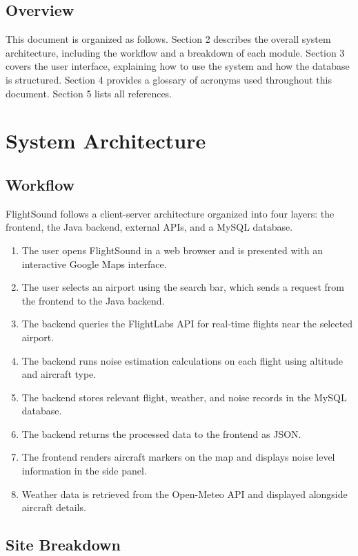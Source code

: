 \documentclass[12pt]{article}
\begin{document}
\subsection{Overview}
This document is organized as follows. Section 2 describes the overall system architecture, including the workflow and a breakdown of each module. Section 3 covers the user interface, explaining how to use the system and how the database is structured. Section 4 provides a glossary of acronyms used throughout this document. Section 5 lists all references.

\newpage

\section{System Architecture}

\subsection{Workflow}
FlightSound follows a client-server architecture organized into four layers: the frontend, the Java backend, external APIs, and a MySQL database.

\begin{enumerate}
\item The user opens FlightSound in a web browser and is presented with an interactive Google Maps interface.
\item The user selects an airport using the search bar, which sends a request from the frontend to the Java backend.
\item The backend queries the FlightLabs API for real-time flights near the selected airport.
\item The backend runs noise estimation calculations on each flight using altitude and aircraft type.
\item The backend stores relevant flight, weather, and noise records in the MySQL database.
\item The backend returns the processed data to the frontend as JSON.
\item The frontend renders aircraft markers on the map and displays noise level information in the side panel.
\item Weather data is retrieved from the Open-Meteo API and displayed alongside aircraft details.
\end{enumerate}

\subsection{Site Breakdown}
\end{document}
